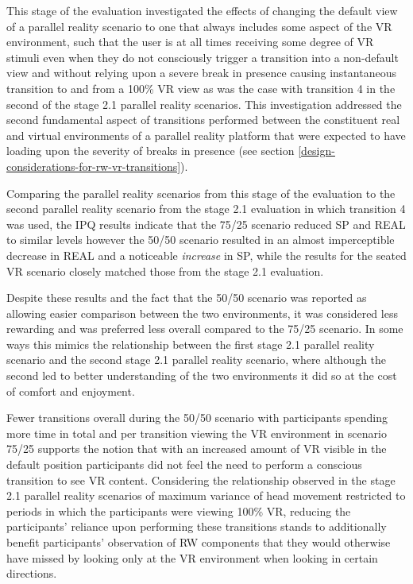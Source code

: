 This stage of the evaluation investigated the effects of changing the default view of a parallel reality scenario to one that always includes some aspect of the VR environment, such that the user is at all times receiving some degree of VR stimuli even when they do not consciously trigger a transition into a non-default view and without relying upon a severe break in presence causing instantaneous transition to and from a 100\% VR view as was the case with transition 4 in the second of the stage 2.1 parallel reality scenarios. This investigation addressed the second fundamental aspect of transitions performed between the constituent real and virtual environments of a parallel reality platform that were expected to have loading upon the severity of breaks in presence (see section \ref{design-considerations-for-rw-vr-transitions}).

Comparing the parallel reality scenarios from this stage of the evaluation to the second parallel reality scenario from the stage 2.1 evaluation in which transition 4 was used, the IPQ results indicate that the 75/25 scenario reduced SP and REAL to similar levels however the 50/50 scenario resulted in an almost imperceptible decrease in REAL and a noticeable \textit{increase} in SP, while the results for the seated VR scenario closely matched those from the stage 2.1 evaluation.

Despite these results and the fact that the 50/50 scenario was reported as allowing easier comparison between the two environments, it was considered less rewarding and was preferred less overall compared to the 75/25 scenario. In some ways this mimics the relationship between the first stage 2.1 parallel reality scenario and the second stage 2.1 parallel reality scenario, where although the second led to better understanding of the two environments it did so at the cost of comfort and enjoyment.

Fewer transitions overall during the 50/50 scenario with participants spending more time in total and per transition viewing the VR environment in scenario 75/25 supports the notion that with an increased amount of VR visible in the default position participants did not feel the need to perform a conscious transition to see VR content. Considering the relationship observed in the stage 2.1 parallel reality scenarios of maximum variance of head movement restricted to periods in which the participants were viewing 100\% VR, reducing the participants' reliance upon performing these transitions stands to additionally benefit participants' observation of RW components that they would otherwise have missed by looking only at the VR environment when looking in certain directions.

